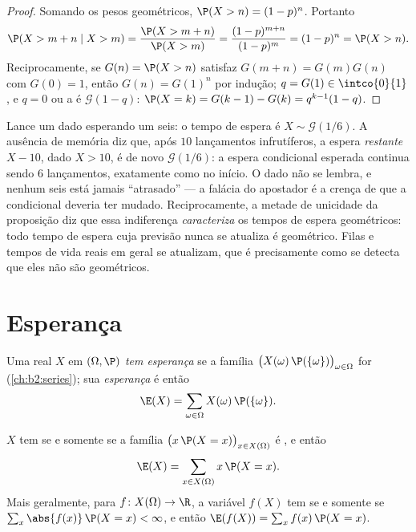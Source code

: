 \begin{proof}
Somando os pesos geométricos, $\P(X > n) = (1-p)^n$. Portanto
\[
\P(X > m + n \mid X > m)
= \frac{\P(X > m + n)}{\P(X > m)}
= \frac{(1-p)^{m+n}}{(1-p)^m} = (1-p)^n = \P(X > n).
\]
Reciprocamente, se $G(n) = \P(X > n)$ satisfaz $G(m + n) =
G(m)G(n)$ com $G(0) = 1$, então $G(n) = G(1)^n$ por indução; $q =
G(1) \in \intco{0}{1}$, e $q = 0$ ou a  é
$\mathcal{G}(1 - q)$: $\P(X = k) = G(k-1) - G(k) =
q^{k-1}(1 - q)$.
\end{proof}

\begin{example}
Lance um dado esperando um seis: o tempo de espera é $X \sim
\mathcal G(1/6)$. A ausência de memória diz que, após $10$
lançamentos infrutíferos, a espera \emph{restante} $X - 10$, dado
$X > 10$, é de novo $\mathcal G(1/6)$: a espera
condicional esperada continua sendo $6$ lançamentos, exatamente como no início.
O dado não se lembra, e nenhum seis está jamais ``atrasado'' --- a
falácia do apostador é a crença de que a  condicional
deveria ter mudado. Reciprocamente, a metade de unicidade da proposição
diz que essa indiferença \emph{caracteriza} os tempos de espera
geométricos: todo tempo de espera cuja previsão nunca se atualiza
é geométrico. Filas e tempos de vida reais em geral se atualizam,
que é precisamente como se detecta que eles não são
geométricos.
\end{example}

\section{Esperança}

\begin{definition}[Esperança]\label{def:b2:randomvar:expectation}
Uma  real $X$ em $(\Omega, \P)$ \emph{tem
esperança} se a família
$\bigl(X(\omega)\,\P(\{\omega\})\bigr)_{\omega \in \Omega}$ for
 (\cref{ch:b2:series}); sua \emph{esperança} é então
\[
\E(X) = \sum_{\omega \in \Omega} X(\omega)\,\P(\{\omega\}) .
\]
\end{definition}

\begin{theorem}\label{thm:b2:randomvar:transfer}
$X$ tem  se e somente se a família $\bigl(x\,\P(X =
x)\bigr)_{x \in X(\Omega)}$ é , e então
\[
\E(X) = \sum_{x \in X(\Omega)} x\,\P(X = x) .
\]
Mais geralmente, para $f \colon X(\Omega) \to \R$, a variável
$f(X)$ tem  se e somente se $\sum_x \abs{f(x)}\,\P(X = x) <
\infty$, e então $\E(f(X)) = \sum_x f(x)\,\P(X = x)$.
\end{theorem}

